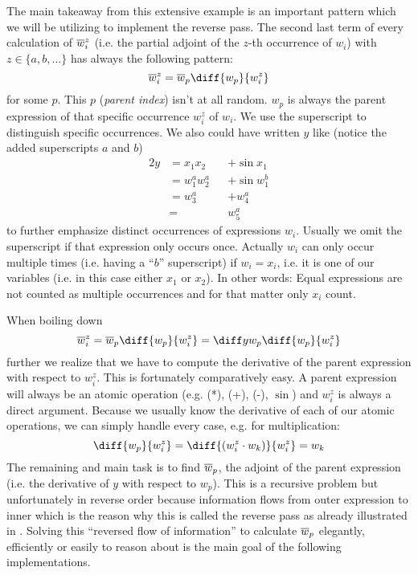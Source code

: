 The main takeaway from this extensive example is an important pattern which we will be utilizing to implement the reverse pass. The second last term of every calculation of $\overline{w}_{i}^z$ (i.e. the partial adjoint of the $z$-th occurrence of $w_i$) with $z \in \{a, b, ...\}$ has always the following pattern:
\newcommand{\defoverwiz}{\overw{i}^z = \overw{p}\diff{w_p}{w_i^z}}
\[ \defoverwiz \]
for some $p$. This $p$ (\emph{parent index}) isn't at all random. $w_p$ is always the parent expression of that specific occurrence $w_i^z$ of $w_i$. We use the superscript to distinguish specific occurrences. We also could have written $y$ like (notice the added superscripts $a$ and $b$)
\begin{alignat*}{2}
    y & = x_1x_2 &  & + \sin{x_1} \\
      & = w_1^a w_2^a &  & + \sin{w_1^b} \\
      & = w_3^a    &  & + w_4^a       \\
      & =        &  & w_5^a
\end{alignat*}
to further emphasize distinct occurrences of expressions $w_i$. Usually we omit the superscript if that expression only occurs once. Actually $w_i$ can only occur multiple times (i.e. having a ``$b$'' superscript) if $w_i = x_i$, i.e. it is one of our variables (i.e. in this case either $x_1$ or $x_2$). In other words: Equal expressions are not counted as multiple occurrences and for that matter only $x_i$ count.

When boiling down
\[ \overw{i}^z = \overw{p}\diff{w_p}{w_i^z} = \diffyw{p}\diff{w_p}{w_i^z} \]
further we realize that we have to compute the derivative of the parent expression with respect to $w_i^z$. This is fortunately comparatively easy. A parent expression will always be an atomic operation (e.g. (*), (+), (-), $\sin$) and $w_i^z$ is always a direct argument. Because we usually know the derivative of each of our atomic operations, we can simply handle every case, e.g. for multiplication:
\[ \diff{w_p}{w_i^z} = \diff{(w_i^z \cdot w_k)}{w_i^z} = w_k \]
The remaining and main task is to find $\overline{w}_{p}$, the adjoint of the parent expression (i.e. the derivative of $y$ with respect to $w_p$). This is a recursive problem but unfortunately in reverse order because information flows from outer expression to inner which is the reason why this is called the reverse pass as already illustrated in . Solving this ``reversed flow of information'' to calculate $\overline{w}_{p}$ elegantly, efficiently or easily to reason about is the main goal of the following implementations.


